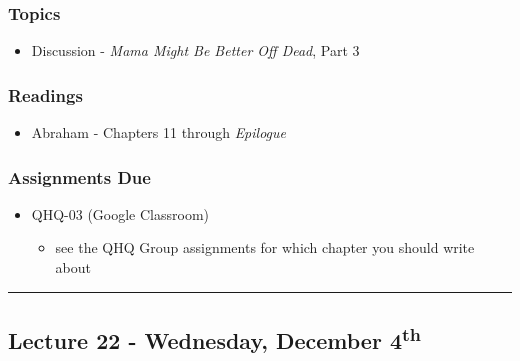 \documentclass[]{book}
\providecommand{\tightlist}{%
  \setlength{\itemsep}{0pt}\setlength{\parskip}{0pt}}
\begin{document}
\hypertarget{topics-28}{%
\subsubsection*{Topics}\label{topics-28}}

\begin{itemize}
\tightlist
\item
  Discussion - \emph{Mama Might Be Better Off Dead}, Part 3
\end{itemize}

\hypertarget{readings-26}{%
\subsubsection*{Readings}\label{readings-26}}

\begin{itemize}
\tightlist
\item
  Abraham - Chapters 11 through \emph{Epilogue}
\end{itemize}

\hypertarget{assignments-due-5}{%
\subsubsection*{Assignments Due}\label{assignments-due-5}}

\begin{itemize}
\tightlist
\item
  QHQ-03 (Google Classroom)

  \begin{itemize}
  \tightlist
  \item
    see the QHQ Group assignments for which chapter you should write about
  \end{itemize}
\end{itemize}

\begin{center}\rule{0.5\linewidth}{\linethickness}\end{center}

\hypertarget{lecture-22---wednesday-december-4th}{%
\subsection*{\texorpdfstring{Lecture 22 - Wednesday, December 4\textsuperscript{th}}{Lecture 22 - Wednesday, December 4th}}\label{lecture-22---wednesday-december-4th}}
\end{document}
